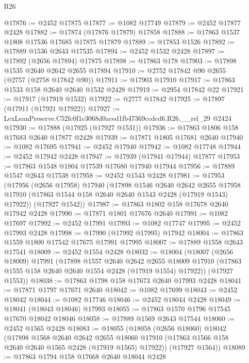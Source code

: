 \begin{lexlean}{R26}
\begin{coremodule}
@17876 := @2452 @17875
@17877 := @1082 @17749
@17879 := @2452 @17877 @2428
@17882 := @17874 (@17876 @17879) @17858
@17888 := @17863 @1537 @1808 @17536 @17685 @17875 @17879
@17889 := @17853 @1526
@17892 := @17889 @1536 @2643 @17535
@17894 := @2452 @1532 @2428
@17897 := @17892 (@2656 @17894) @17875
@17898 := @17863 @178
@17903 := @17898 @1535 @2640 @2642 @2655 @17894
@17910 := @2752 @17842 @90 @2655 (@2757 (@2758 @17842 @90))
@17911 := @17903 @17910
@17917 := @17863 @1533 @158 @2640 @2640 @1532 @2428
@17919 := @2954 @17842 @22
@17921 := @17917 (@17919 @1532)
@17922 := @2777 @17842
@17925 := @17897 (@17911 (@17921 @17922))
@17927 := LexLeanPreserve.C52fc0f1c3068d0aced1fb47369ccdcd6.R26.__rel_29 @2424
@17930 := @17888 (@17925 (@17927 @1531))
@17936 := @17863 @1806 @158 @17683 @2640 @17877 @2428
@17939 := @17871 @1805 @17681 @2640
@17940 := @1082 @17695
@17941 := @2452 @17940
@17942 := @1082 @17748
@17944 := @2452 @17942 @2428
@17947 := @17939 (@17941 @17944) @17877
@17953 := @17863 @1548 @1804 @17539 @17680 @17940 @17944
@17956 := @17889 @1547 @2643 @17538
@17958 := @2452 @1543 @2428
@17981 := @17953
    (@17956
      (@2656 @17958)
      @17940
      (@17898
        @1546
        @2640
        @2642
        @2655
        @17958
        @17910
        (@17863 @1544 @158 @2640 @2640 @1543 @2428 (@17919 @1543) @17922))
      (@17927 @1542))
@17987 := @17863 @1802 @158 @17678 @2640 @17942 @2428
@17990 := @17871 @1801 @17676 @2640
@17991 := @1082 @17697
@17992 := @2452 @17991
@17993 := @1082 @17747
@17995 := @2452 @17993 @2428
@17998 := @17990 (@17992 @17995) @17942
@18004 := @17863 @1559 @1800 @17542 @17675 @17991 @17995
@18007 := @17889 @1558 @2643 @17541
@18009 := @2452 @1554 @2428
@18032 := @18004
    (@18007
      (@2656 @18009)
      @17991
      (@17898
        @1557
        @2640
        @2642
        @2655
        @18009
        @17910
        (@17863 @1555 @158 @2640 @2640 @1554 @2428 (@17919 @1554) @17922))
      (@17927 @1553))
@18038 := @17863 @1798 @158 @17673 @2640 @17993 @2428
@18041 := @17871 @1797 @17671 @2640
@18042 := @1082 @17699
@18043 := @2452 @18042
@18044 := @1082 @17746
@18046 := @2452 @18044 @2428
@18049 := @18041 (@18043 @18046) @17993
@18055 := @17863 @1570 @1796 @17545 @17670 @18042 @18046
@18058 := @17889 @1569 @2643 @17544
@18060 := @2452 @1565 @2428
@18083 := @18055
    (@18058
      (@2656 @18060)
      @18042
      (@17898
        @1568
        @2640
        @2642
        @2655
        @18060
        @17910
        (@17863 @1566 @158 @2640 @2640 @1565 @2428 (@17919 @1565) @17922))
      (@17927 @1564))
@18089 := @17863 @1794 @158 @17668 @2640 @18044 @2428

\end{coremodule}
\end{lexlean}
